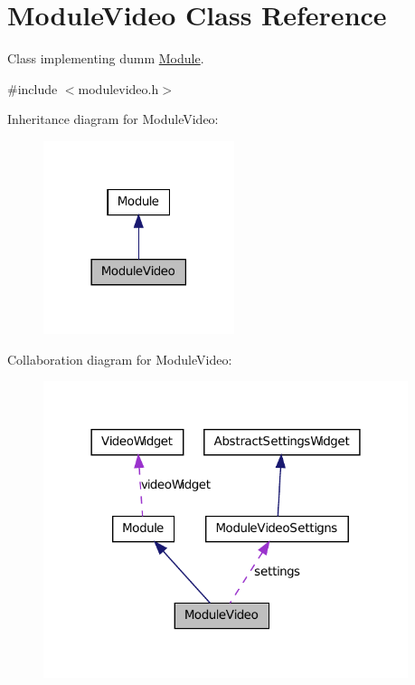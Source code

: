 \hypertarget{class_module_video}{
\section{ModuleVideo Class Reference}
\label{db/d7c/class_module_video}
}


Class implementing dumm \hyperlink{class_module}{Module}.  




{\ttfamily \#include $<$modulevideo.h$>$}



Inheritance diagram for ModuleVideo:\nopagebreak
\begin{figure}[H]
\begin{center}
\leavevmode
\includegraphics[width=158pt]{d7/dce/class_module_video__inherit__graph}
\end{center}
\end{figure}


Collaboration diagram for ModuleVideo:\nopagebreak
\begin{figure}[H]
\begin{center}
\leavevmode
\includegraphics[width=302pt]{d4/d89/class_module_video__coll__graph}
\end{center}
\end{figure}

